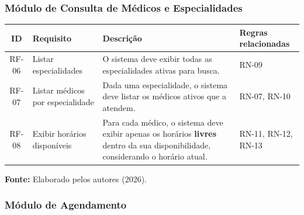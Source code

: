 \documentclass[12pt,a4paper]{article}
\newcommand{\fonte}[1]{%
  \par\vspace{2pt}%
  {\footnotesize\raggedright\textbf{Fonte:} #1\par}%
}
\begin{document}
\subsubsection{Módulo de Consulta de Médicos e Especialidades}

\begin{table}[H]
\centering
{\footnotesize
\begin{tabularx}{\textwidth}{@{}c>{\raggedright\arraybackslash}p{2.9cm}>{\raggedright\arraybackslash}X>{\raggedright\arraybackslash}p{2.7cm}@{}}
\toprule
ID & Requisito & Descrição & Regras relacionadas \\
\midrule
RF-06 & Listar especialidades & O sistema deve exibir todas as especialidades ativas para busca. & RN-09 \\
RF-07 & Listar médicos por especialidade & Dada uma especialidade, o sistema deve listar os médicos ativos que a atendem. & RN-07, RN-10 \\
RF-08 & Exibir horários disponíveis & Para cada médico, o sistema deve exibir apenas os horários \textbf{livres} dentro da sua disponibilidade, considerando o horário atual. & RN-11, RN-12, RN-13 \\
\bottomrule
\end{tabularx}
}
\fonte{Elaborado pelos autores (2026).}
\end{table}

\subsubsection{Módulo de Agendamento}
\end{document}
